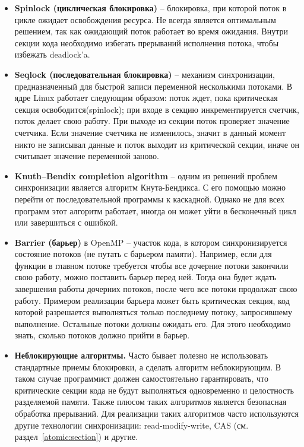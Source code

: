 \begin{itemize}
    \item\textbf{Spinlock (циклическая блокировка)} -- блокировка, при которой поток в цикле ожидает освобождения ресурса. Не всегда является оптимальным решением, так как ожидающий поток работает во время ожидания. Внутри секции кода необходимо избегать прерываний исполнения потока, чтобы избежать deadlock'a.
    
    \item\textbf{Seqlock (последовательная блокировка)} -- механизм синхронизации, предназначенный для быстрой записи переменной несколькими потоками. В ядре Linux работает следующим образом: поток ждет, пока критическая секция освободится(spinlock); при входе в секцию инкрементируется счетчик, поток делает свою работу. При выходе из секции поток проверяет значение счетчика. Если значение счетчика не изменилось, значит в данный момент никто не записывал данные и поток выходит из критической секции, иначе он считывает значение переменной заново.
    
    \item\textbf{Knuth–Bendix сompletion algorithm} -- одним из решений проблем синхронизации является алгоритм Кнута-Бендикса. С его помощью можно перейти от последовательной программы к каскадной. Однако не для всех программ этот алгоритм работает, иногда он может уйти в бесконечный цикл или завершиться с ошибкой.
    
    \item\textbf{Barrier (барьер)} в OpenMP -- участок кода, в котором синхронизируется состояние потоков (не путать с барьером памяти). Например, если для функции в главном потоке требуется чтобы все дочерние потоки закончили свою работу, можно поставить барьер перед ней. Тогда она будет ждать завершения работы дочерних потоков, после чего все потоки продолжат свою работу. Примером реализации барьера может быть критическая секция, код которой разрешается выполняться только последнему потоку, запросившему выполнение. Остальные потоки должны ожидать его. Для этого необходимо знать, сколько потоков должно прийти в барьер.
    
    \item\textbf{Неблокирующие алгоритмы.} Часто бывает полезно не использовать стандартные приемы блокировки, а сделать алгоритм неблокирующим. В таком случае программист должен самостоятельно гарантировать, что критические секции кода не будут выполняться одновременно и целостность разделяемой памяти. Также плюсом таких алгоритмов является безопасная обработка прерываний. Для реализации таких алгоритмов часто используются другие технологии синхронизации: read-modify-write, CAS (см. раздел~\ref{atomic:section}) и другие.
    

\end{itemize}
